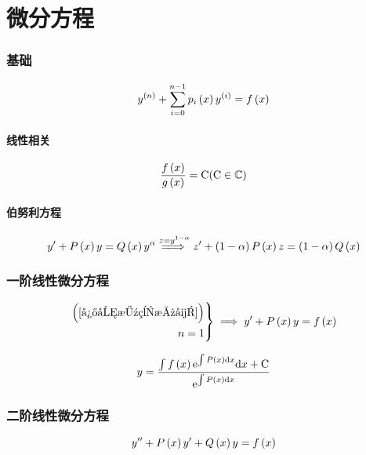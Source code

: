 \documentclass{article}
\begin{document}
\part{微分方程}

\section{基础}

\begin{definition}[$n$阶线性微分方程]
    \[y^{\left(n\right)}+\sum_{i=0}^{n-1}p_i\left(x\right)y^{\left(i\right)}=f\left(x\right)\label{微分方程总式}\]
\end{definition}

\subsection{线性相关}

\[\frac{f\left(x\right)}{g\left(x\right)}=\mathrm C(\mathrm C\in\mathbb C)\]

\subsection{伯努利方程}
\[y^\prime+P\left(x\right)y=Q\left(x\right)y^\alpha\stackrel{z=y^{1-\alpha}}{=\!\!\!\implies} z^\prime+\left(1-\alpha\right)P\left(x\right)z=\left(1-\alpha\right)Q\left(x\right)\]
\section{一阶线性微分方程}

\begin{definition}
    \[\left.\begin{aligned}
            \left(\ref{微分方程总式}\right) \\
            n=1
        \end{aligned}\right\}
        \implies
        y^\prime+P\left(x\right)y=f\left(x\right)\]
\end{definition}

\begin{theorem}[通解]
    \[y=\frac{\int{f\left(x\right)\mathrm e^{\int P\left(x\right)\mathrm dx}\mathrm dx}+\mathrm C}{\mathrm e^{\int P\left(x\right)\mathrm d x}}\]
\end{theorem}

\section{二阶线性微分方程}

\begin{definition}[]
    \[y^{\prime\prime}+P\left(x\right)y^\prime+Q\left(x\right)y=f\left(x\right)\]
\end{definition}
\end{document}
